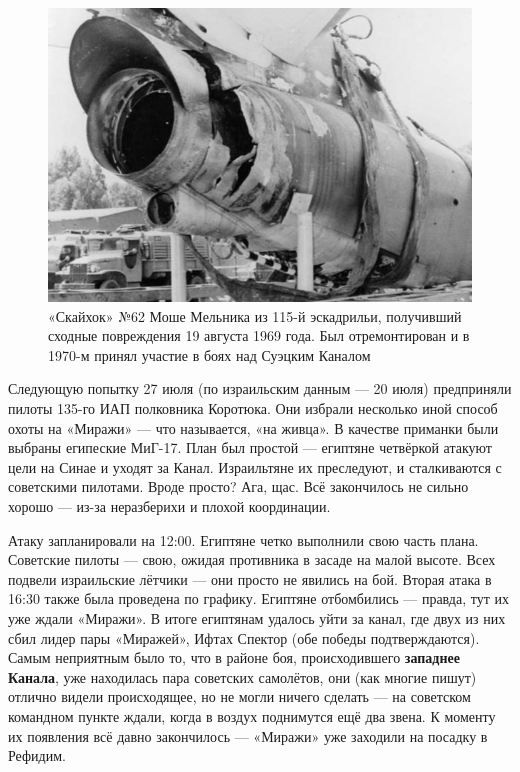 \begin{figure}[h!tb] 
	\centering\includegraphics[scale=0.4]{Dolina_4/c8PBnljCPeo.jpg}
	\caption{«Скайхок» №62 Моше Мельника из 115-й эскадрильи, получивший сходные повреждения 19 августа 1969 года. Был отремонтирован и в 1970-м принял участие в боях над Суэцким Каналом}%
\end{figure}

Следующую попытку 27 июля (по израильским данным — 20 июля) предприняли пилоты 135-го ИАП полковника Коротюка. Они избрали несколько иной способ охоты на «Миражи» — что называется, «на живца». В качестве приманки были выбраны египеские МиГ-17. План был простой — египтяне четвёркой атакуют цели на Синае и уходят за Канал. Израильтяне их преследуют, и сталкиваются с советскими пилотами. Вроде просто? Ага, щас. Всё закончилось не сильно хорошо — из-за неразберихи и плохой координации.

Атаку запланировали на 12:00. Египтяне четко выполнили свою часть плана. Советские пилоты — свою, ожидая противника в засаде на малой высоте. Всех подвели израильские лётчики — они просто не явились на бой. Вторая атака в 16:30 также была проведена по графику. Египтяне отбомбились — правда, тут их уже ждали «Миражи». В итоге египтянам удалось уйти за канал, где двух из них сбил лидер пары «Миражей», Ифтах Спектор (обе победы подтверждаются). Самым неприятным было то, что в районе боя, происходившего \textbf{западнее Канала}, уже находилась пара советских самолётов, они (как многие пишут) отлично видели происходящее, но не могли ничего сделать — на советском командном пункте ждали, когда в воздух поднимутся ещё два звена. К моменту их появления всё давно закончилось — «Миражи» уже заходили на посадку в Рефидим.

